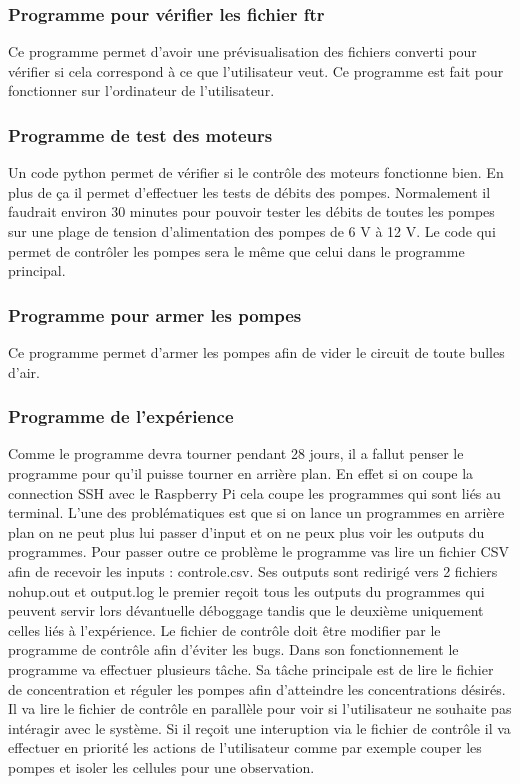 \documentclass[a4paper, 11pt]{article}
\begin{document}
\subsubsection{Programme pour vérifier les fichier ftr}
Ce programme permet d'avoir une prévisualisation des fichiers converti pour vérifier si cela correspond à ce que l'utilisateur veut. Ce programme est fait pour fonctionner sur l'ordinateur de l'utilisateur.
\subsubsection{Programme de test des moteurs}
Un code python permet de vérifier si le contrôle des moteurs fonctionne bien.
En plus de ça il permet d'effectuer les tests de débits des pompes.
Normalement il faudrait environ 30 minutes pour pouvoir tester les débits de toutes les pompes sur une plage de tension d'alimentation des pompes de 6 V à 12 V.
Le code qui permet de contrôler les pompes sera le même que celui dans le programme principal.
\subsubsection{Programme pour armer les pompes}
Ce programme permet d'armer les pompes afin de vider le circuit de toute bulles d'air.
\subsubsection{Programme de l'expérience}
Comme le programme devra tourner pendant 28 jours, il a fallut penser le programme pour qu'il puisse tourner en arrière plan. En effet si on coupe la connection SSH avec le Raspberry Pi cela coupe les programmes qui sont liés au terminal.
L'une des problématiques est que si on lance un programmes en arrière plan on ne peut plus lui passer d'input et on ne peux plus voir les outputs du programmes.
Pour passer outre ce problème le programme vas lire un fichier CSV afin de recevoir les inputs : controle.csv.
Ses outputs sont redirigé vers 2 fichiers nohup.out et output.log le premier reçoit tous les outputs du programmes qui peuvent servir lors dévantuelle déboggage tandis que le deuxième uniquement celles liés à l'expérience.
Le fichier de contrôle doit être modifier par le programme de contrôle afin d'éviter les bugs.
Dans son fonctionnement le programme va effectuer plusieurs tâche. Sa tâche principale est de lire le fichier de concentration et réguler les pompes afin d'atteindre les concentrations désirés.
Il va lire le fichier de contrôle en parallèle pour voir si l'utilisateur ne souhaite pas intéragir avec le système.
Si il reçoit une interuption via le fichier de contrôle il va effectuer en priorité les actions de l'utilisateur comme par exemple couper les pompes et isoler les cellules pour une observation.
\end{document}
